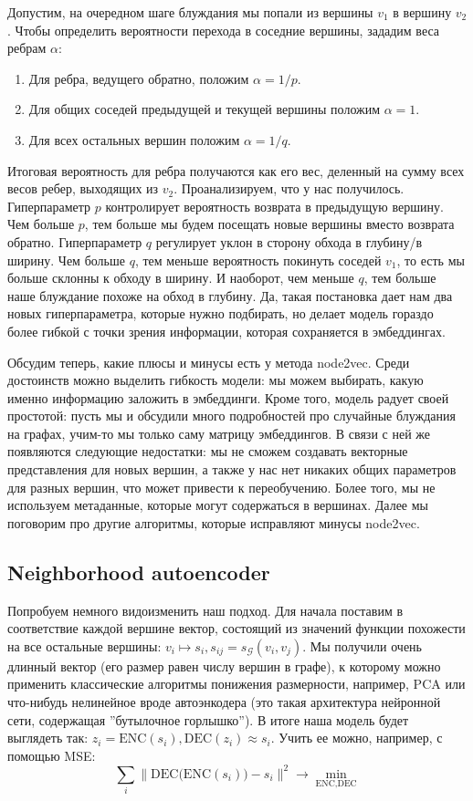\documentclass[12pt,a4paper]{article}
\newcommand{\ENC}{\text{ENC}}
\newcommand{\DEC}{\text{DEC}}
\begin{document}
\noindent
Допустим, на очередном шаге блуждания мы попали из вершины $v_1$ в вершину $v_2$. Чтобы определить вероятности перехода в соседние вершины, зададим веса ребрам $\alpha$:
\begin{enumerate}
    \item Для ребра, ведущего обратно, положим $\alpha = 1/p$.
    \item Для общих соседей предыдущей и текущей вершины положим $\alpha=1$.
    \item Для всех остальных вершин положим $\alpha = 1/q$.
\end{enumerate}

\noindent
Итоговая вероятность для ребра получаются как его вес, деленный на сумму всех весов ребер, выходящих из $v_2$. Проанализируем, что у нас получилось. Гиперпараметр $p$ контролирует вероятность возврата в предыдущую вершину. Чем больше $p$, тем больше мы будем посещать новые вершины вместо возврата обратно. Гиперпараметр $q$ регулирует уклон в сторону обхода в глубину/в ширину. Чем больше $q$, тем меньше вероятность покинуть соседей $v_1$, то есть мы больше склонны к обходу в ширину. И наоборот, чем меньше $q$, тем больше наше блуждание похоже на обход в глубину. Да, такая постановка дает нам два новых гиперпараметра, которые нужно подбирать, но делает модель гораздо более гибкой с точки зрения информации, которая сохраняется в эмбеддингах. 

Обсудим теперь, какие плюсы и минусы есть у метода node2vec. Среди достоинств можно выделить гибкость модели: мы можем выбирать, какую именно информацию заложить в эмбеддинги. Кроме того, модель радует своей простотой: пусть мы и обсудили много подробностей про случайные блуждания на графах, учим-то мы только саму матрицу эмбеддингов. В связи с ней же появляются следующие недостатки: мы не сможем создавать векторные представления для новых вершин, а также у нас нет никаких общих параметров для разных вершин, что может привести к переобучению. Более того, мы не используем метаданные, которые могут содержаться в вершинах. Далее мы поговорим про другие алгоритмы, которые исправляют минусы node2vec.

\subsection{Neighborhood autoencoder}

Попробуем немного видоизменить наш подход. Для начала поставим в соответствие каждой вершине вектор, состоящий из значений функции похожести на все остальные вершины: $v_i \mapsto s_i, s_{ij} = s_{\mathcal{G}}(v_i, v_j)$. Мы получили очень длинный вектор (его размер равен числу вершин в графе), к которому можно применить классические алгоритмы понижения размерности, например, PCA или что-нибудь нелинейное вроде автоэнкодера (это такая архитектура нейронной сети, содержащая ''бутылочное горлышко''). В итоге наша модель будет выглядеть так: $z_i = \ENC(s_i), \DEC(z_i) \approx s_i$. Учить ее можно, например, с помощью MSE:
$$
\sum_{i} \Big\|\DEC\big(\ENC(s_i)\big) - s_i\Big\|^2 \to \min_{\ENC, \DEC}
$$
\end{document}
